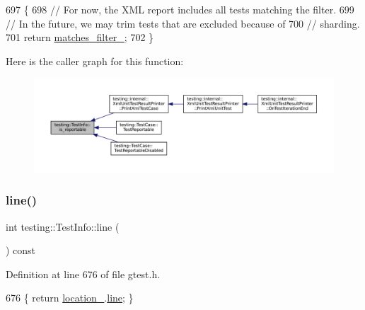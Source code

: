 \begin{DoxyCode}
697                              \{
698     \textcolor{comment}{// For now, the XML report includes all tests matching the filter.}
699     \textcolor{comment}{// In the future, we may trim tests that are excluded because of}
700     \textcolor{comment}{// sharding.}
701     \textcolor{keywordflow}{return} \hyperlink{classtesting_1_1TestInfo_a397686f82b6dd68a209ab7b50eeb4932}{matches\_filter\_};
702   \}
\end{DoxyCode}
Here is the caller graph for this function\+:
\nopagebreak
\begin{figure}[H]
\begin{center}
\leavevmode
\includegraphics[width=350pt]{classtesting_1_1TestInfo_a63e7042028b0b846f4b5a1e5bcffc079_icgraph}
\end{center}
\end{figure}
\mbox{\label{classtesting_1_1TestInfo_af5931cfc594b5d660c56b3c61c41ea13}} 
\subsubsection{\texorpdfstring{line()}{line()}}
{\footnotesize\ttfamily int testing\+::\+Test\+Info\+::line (\begin{DoxyParamCaption}{ }\end{DoxyParamCaption}) const\hspace{0.3cm}{\ttfamily [inline]}}



Definition at line 676 of file gtest.\+h.


\begin{DoxyCode}
676 \{ \textcolor{keywordflow}{return} \hyperlink{classtesting_1_1TestInfo_a749494420174e6cf1949c7b411e8df6f}{location\_}.\hyperlink{structtesting_1_1internal_1_1CodeLocation_a01c977c7e8834a05a6d6c40b0c416045}{line}; \}
\end{DoxyCode}
\mbox{\label{classtesting_1_1TestInfo_ac2581b45eccc9a3b94cb41c4807d0e34}} 
